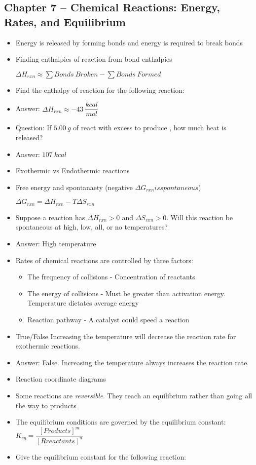 \documentclass[12pt, letterpaper]{memoir}
\begin{document}
	\subsection*{Chapter 7 -- Chemical Reactions: Energy, Rates, and Equilibrium}
	\begin{itemize}
		\item Energy is released by forming bonds and energy is required to break bonds
		\item Finding enthalpies of reaction from bond enthalpies
		
		$\Delta H_{rxn} \approx \displaystyle\sum Bonds~Broken - \displaystyle\sum Bonds~Formed$
		
		\item Find the enthalpy of reaction for the following reaction:
		
		\item Answer: $\Delta H_{rxn} \approx -43~\dfrac{kcal}{mol}$
		\item Question: If $5.00~g$ of  react with excess  to produce , how much heat is released?
		\item Answer: $107~kcal$
		\item Exothermic vs Endothermic reactions
		\item Free energy and spontanaety (negative $\Delta G_{rxn} is spontaneous$)
		
		$\Delta G_{rxn} = \Delta H_{rxn} - T \Delta S_{rxn}$
		\item Suppose a reaction has $\Delta H_{rxn}>0$ and $\Delta S_{rxn}>0$. Will this reaction be spontaneous at high, low, all, or no temperatures?
		\item Answer: High temperature
		\item Rates of chemical reactions are controlled by three factors:
		\begin{itemize}
			\item The frequency of collisions - Concentration of reactants
			\item The energy of collisions - Must be greater than activation energy. Temperature dictates average energy
			\item Reaction pathway - A catalyst could speed a reaction
		\end{itemize}
		\item True/False Increasing the temperature will decrease the reaction rate for exothermic reactions.
		\item Answer: False. Increasing the temperature always increases the reaction rate.
		\item Reaction coordinate diagrams
		\item Some reactions are \emph{reversible}. They reach an equilibrium rather than going all the way to products
		\item The equilibrium conditions are governed by the equilibrium constant: $K_{eq}=\dfrac{[Products]^m}{[Rreactants]^n}$
		\item Give the equilibrium constant for the following reaction:
		

\end{itemize}
\end{document}
